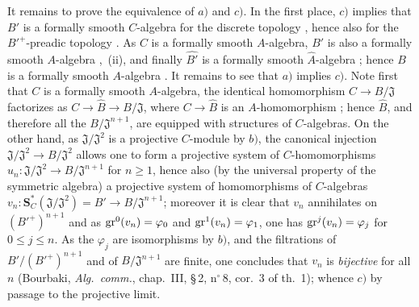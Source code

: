\begin{env}[19.5.4.4]
\label{0.19.5.4.4}
It remains to prove the equivalence of $a)$ and $c)$.
In the first place, $c)$ implies that $B'$ is a formally smooth $C$-algebra for the discrete topology , hence also for the ${B'}^+$-preadic topology .
As $C$ is a formally smooth $A$-algebra, $B'$ is also a formally smooth $A$-algebra ,~{\rm(ii)}, and finally $\widehat{B'}$ is a formally smooth $\widehat{A}$-algebra ; hence $B$ is a formally smooth $A$-algebra .
It remains to see that $a)$ implies $c)$.
Note first that $C$ is a formally smooth $A$-algebra, the identical homomorphism $C\to B/\mathfrak{J}$ factorizes as $C\to\widehat{B}\to B/\mathfrak{J}$, where $C\to\widehat{B}$ is an $A$-homomorphism ;
hence $\widehat{B}$, and therefore all the $B/\mathfrak{J}^{n+1}$, are equipped with structures of $C$-algebras.
On the other hand, as $\mathfrak{J}/\mathfrak{J}^2$ is a projective $C$-module by $b)$, the canonical injection $\mathfrak{J}/\mathfrak{J}^2\to B/\mathfrak{J}^2$ allows one to form a projective system of $C$-homomorphisms $u_n:\mathfrak{J}/\mathfrak{J}^2\to B/\mathfrak{J}^{n+1}$ for $n\geq 1$, hence also (by the universal property of the symmetric algebra) a projective system of homomorphisms of $C$-algebras $v_n:\mathbf{S}_C^*(\mathfrak{J}/\mathfrak{J}^2)=B'\to B/\mathfrak{J}^{n+1}$;
moreover it is clear that $v_n$ annihilates on $({B'}^+)^{n+1}$ and as $\operatorname{gr}^0(v_n)=\varphi_0$ and $\operatorname{gr}^1(v_n)=\varphi_1$, one has $\operatorname{gr}^j(v_n)=\varphi_j$ for $0\leq j\leq n$.
As the $\varphi_j$ are isomorphisms by $b)$, and the filtrations of $B'/({B'}^+)^{n+1}$ and of $B/\mathfrak{J}^{n+1}$ are finite, one concludes that $v_n$ is \emph{bijective} for
all $n$ (Bourbaki, \emph{Alg.\ comm.}, chap.~III, \S\,2, n$^\circ$\,8, cor.~3 of th.~1); whence $c)$ by passage to the projective limit.
\end{env}

